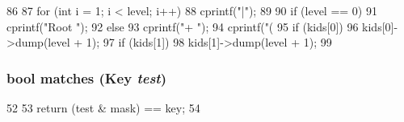 \begin{DoxyCode}
86         {
87             for (int i = 1; i < level; i++) {
88                 cprintf("|");
89             }
90             if (level == 0)
91                 cprintf("Root ");
92             else
93                 cprintf("+ ");
94             cprintf("(%
95             if (kids[0])
96                 kids[0]->dump(level + 1);
97             if (kids[1])
98                 kids[1]->dump(level + 1);
99         }
\end{DoxyCode}
\hypertarget{structTrie_1_1Node_a448e0793acbfb602b919b40a8ab34c99}{
\subsubsection[{matches}]{\setlength{\rightskip}{0pt plus 5cm}bool matches (Key {\em test})}}
\label{structTrie_1_1Node_a448e0793acbfb602b919b40a8ab34c99}



\begin{DoxyCode}
52         {
53             return (test & mask) == key;
54         }
\end{DoxyCode}


